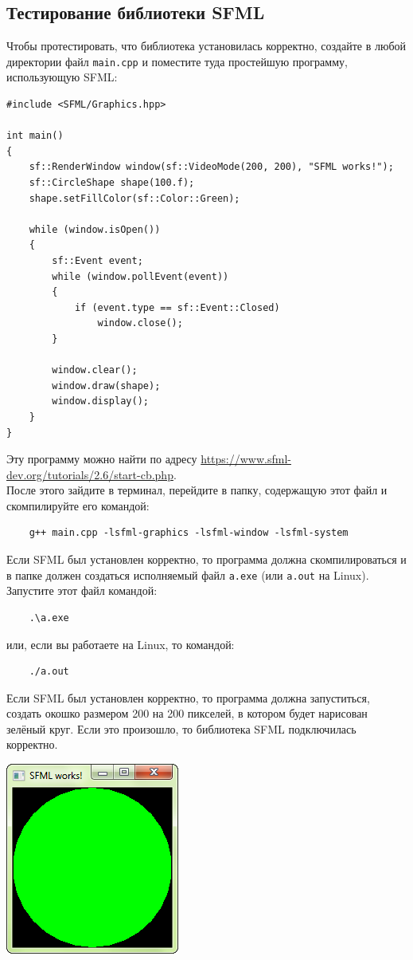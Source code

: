\documentclass{article}
\begin{document}
\subsection*{Тестирование библиотеки SFML}
Чтобы протестировать, что библиотека установилась корректно, создайте в любой директории файл \texttt{main.cpp} и поместите туда простейшую программу, использующую SFML:
\begin{lstlisting}
#include <SFML/Graphics.hpp>

int main()
{
    sf::RenderWindow window(sf::VideoMode(200, 200), "SFML works!");
    sf::CircleShape shape(100.f);
    shape.setFillColor(sf::Color::Green);

    while (window.isOpen())
    {
        sf::Event event;
        while (window.pollEvent(event))
        {
            if (event.type == sf::Event::Closed)
                window.close();
        }

        window.clear();
        window.draw(shape);
        window.display();
    }
}
\end{lstlisting}
Эту программу можно найти по адресу \href{https://www.sfml-dev.org/tutorials/2.6/start-cb.php}{https://www.sfml-dev.org/tutorials/2.6/start-cb.php}.\\
После этого зайдите в терминал, перейдите в папку, содержащую этот файл и скомпилируйте его командой:
\begin{verbatim}
    g++ main.cpp -lsfml-graphics -lsfml-window -lsfml-system
\end{verbatim}
Если SFML был установлен корректно, то программа должна скомпилироваться и в папке должен создаться исполняемый файл \texttt{a.exe} (или \texttt{a.out} на Linux). Запустите этот файл командой:
\begin{verbatim}
    .\a.exe
\end{verbatim}
или, если вы работаете на Linux, то командой:
\begin{verbatim}
    ./a.out
\end{verbatim}
Если SFML был установлен корректно, то программа должна запуститься, создать окошко размером 200 на 200 пикселей, в котором будет нарисован зелёный круг. Если это произошло, то библиотека SFML подключилась корректно.

\begin{center}
\includegraphics[scale=0.5]{../images/sfml_works.png}
\end{center}
\end{document}
